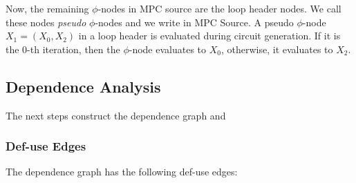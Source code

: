 Now, the remaining $\phi$-nodes in MPC source are the loop header nodes. We call these nodes \emph{pseudo} $\phi$-nodes
and we write  in MPC Source. A pseudo $\phi$-node $X_1 = $$(X_0,X_2)$ in a loop header is evaluated
during circuit generation. If it is the 0-th iteration, then the $\phi$-node evaluates to $X_0$, otherwise, it evaluates to $X_2$.


\subsection{Dependence Analysis}

The next steps construct the dependence graph and 

\subsubsection{Def-use Edges}

The dependence graph has the following def-use edges:


